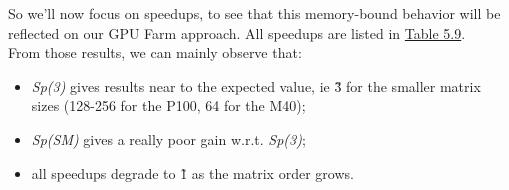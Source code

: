 So we'll now focus on speedups, to see that this memory-bound behavior will be reflected on our GPU Farm approach. All speedups are listed in \hyperref[tab:matspeedup]{Table 5.9}.\\
From those results, we can mainly observe that:
\begin{itemize}
	\item \textit{Sp(3)} gives results near to the expected value, ie \~3 for the smaller matrix sizes (128-256 for the P100, 64 for the M40);
	
	\item 	\textit{Sp(SM)} gives a really poor gain w.r.t. \textit{Sp(3)};
	
	\item all speedups degrade  to \~1 as the matrix order grows.
\end{itemize}






	
	
